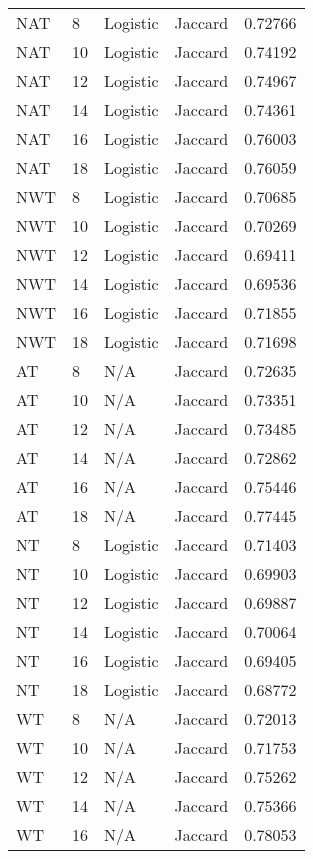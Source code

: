 \documentclass{article}
\begin{document}
\begin{center}
\begin{supertabular}{| l | l | l | l | l |}
            NAT & 8 & Logistic & Jaccard & 0.72766 \\
            NAT & 10 & Logistic & Jaccard & 0.74192 \\
            NAT & 12 & Logistic & Jaccard & 0.74967 \\
            NAT & 14 & Logistic & Jaccard & 0.74361 \\
            NAT & 16 & Logistic & Jaccard & 0.76003 \\
            NAT & 18 & Logistic & Jaccard & 0.76059 \\
            NWT & 8 & Logistic & Jaccard & 0.70685 \\
            NWT & 10 & Logistic & Jaccard & 0.70269 \\
            NWT & 12 & Logistic & Jaccard & 0.69411 \\
            NWT & 14 & Logistic & Jaccard & 0.69536 \\
            NWT & 16 & Logistic & Jaccard & 0.71855 \\
            NWT & 18 & Logistic & Jaccard & 0.71698 \\
            AT & 8 & N/A & Jaccard & 0.72635 \\
            AT & 10 & N/A & Jaccard & 0.73351 \\
            AT & 12 & N/A & Jaccard & 0.73485 \\
            AT & 14 & N/A & Jaccard & 0.72862 \\
            AT & 16 & N/A & Jaccard & 0.75446 \\
            AT & 18 & N/A & Jaccard & 0.77445 \\
            NT & 8 & Logistic & Jaccard & 0.71403 \\
            NT & 10 & Logistic & Jaccard & 0.69903 \\
            NT & 12 & Logistic & Jaccard & 0.69887 \\
            NT & 14 & Logistic & Jaccard & 0.70064 \\
            NT & 16 & Logistic & Jaccard & 0.69405 \\
            NT & 18 & Logistic & Jaccard & 0.68772 \\
            WT & 8 & N/A & Jaccard & 0.72013 \\
            WT & 10 & N/A & Jaccard & 0.71753 \\
            WT & 12 & N/A & Jaccard & 0.75262 \\
            WT & 14 & N/A & Jaccard & 0.75366 \\
            WT & 16 & N/A & Jaccard & 0.78053 \\

\end{supertabular}
\end{center}
\end{document}
